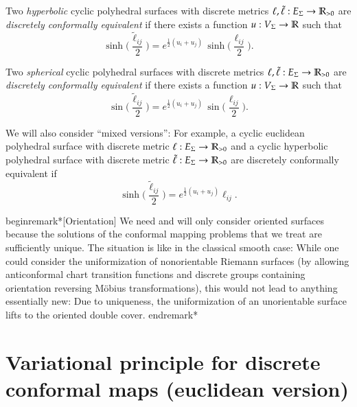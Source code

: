 \documentclass[Thesis.tex]{subfiles}
\begin{document}
Two \emph{hyperbolic} cyclic polyhedral surfaces with
discrete metrics $\ell,\tilde\ell:E_{\Sigma}\rightarrow\mathbb R_{>0}$ are
\emph{discretely conformally equivalent} if there exists a function
$u:V_{\Sigma}\rightarrow\mathbb R$ such that
\begin{equation}
\label{eq:tilde_ell_hyp}
\sinh\Big(\frac{\tilde\ell_\mathit{ij}}{2}\Big)
= e^{\frac{1}{2}(u_{i}+u_{j})}\,
\sinh\Big(\frac{\ell_\mathit{ij}}{2}\Big).
\end{equation}


Two \emph{spherical} cyclic polyhedral surfaces with
discrete metrics $\ell,\tilde\ell:E_{\Sigma}\rightarrow\mathbb R_{>0}$ are
\emph{discretely conformally equivalent} if there exists a function
$u:V_{\Sigma}\rightarrow\mathbb R$ such that
\begin{equation}
\label{eq:tilde_ell_sph}
\sin\Big(\frac{\tilde\ell_\mathit{ij}}{2}\Big)
= e^{\frac{1}{2}(u_{i}+u_{j})}\,
\sin\Big(\frac{\ell_\mathit{ij}}{2}\Big).
\end{equation}

We will also consider ``mixed versions'': For example, a cyclic
euclidean polyhedral surface with discrete metric
$\ell:E_{\Sigma}\rightarrow\mathbb R_{>0}$ and a cyclic hyperbolic polyhedral
surface with discrete metric $\tilde\ell:E_{\Sigma}\rightarrow\mathbb R_{>0}$
are discretely conformally equivalent if
\begin{equation*}
\sinh\Big(\frac{\tilde\ell_\mathit{ij}}{2}\Big)
= e^{\frac{1}{2}(u_{i}+u_{j})}\ell_\mathit{ij}.
\end{equation*}

begin{remark*}[Orientation]
We need and will only consider oriented surfaces because the
solutions of the conformal mapping problems that we treat are
sufficiently unique. The situation is like in the classical smooth
case: While one could consider the uniformization of nonorientable
Riemann surfaces (by allowing anticonformal chart transition
functions and discrete groups containing orientation reversing
M\"obius transformations), this would not lead to anything
essentially new: Due to uniqueness, the uniformization of an
unorientable surface lifts to the oriented double cover.
end{remark*}



\section{Variational principle for discrete conformal maps (euclidean version)}
\label{sec:vari-princ}

\end{document}
